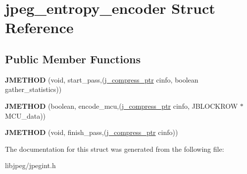 \hypertarget{structjpeg__entropy__encoder}{\section{jpeg\-\_\-entropy\-\_\-encoder Struct Reference}
\label{structjpeg__entropy__encoder}
}
\subsection*{Public Member Functions}
\begin{DoxyCompactItemize}
\item 
\hypertarget{structjpeg__entropy__encoder_aa42cc97f950746e53857b958e00519dd}{{\bfseries J\-M\-E\-T\-H\-O\-D} (void, start\-\_\-pass,(\hyperlink{structjpeg__compress__struct}{j\-\_\-compress\-\_\-ptr} cinfo, boolean gather\-\_\-statistics))}\label{structjpeg__entropy__encoder_aa42cc97f950746e53857b958e00519dd}

\item 
\hypertarget{structjpeg__entropy__encoder_a6852c01b9a63cceaae5f1d0e4ef1185a}{{\bfseries J\-M\-E\-T\-H\-O\-D} (boolean, encode\-\_\-mcu,(\hyperlink{structjpeg__compress__struct}{j\-\_\-compress\-\_\-ptr} cinfo, J\-B\-L\-O\-C\-K\-R\-O\-W $\ast$M\-C\-U\-\_\-data))}\label{structjpeg__entropy__encoder_a6852c01b9a63cceaae5f1d0e4ef1185a}

\item 
\hypertarget{structjpeg__entropy__encoder_a349e641fd2289448e8169b8aa8edefa5}{{\bfseries J\-M\-E\-T\-H\-O\-D} (void, finish\-\_\-pass,(\hyperlink{structjpeg__compress__struct}{j\-\_\-compress\-\_\-ptr} cinfo))}\label{structjpeg__entropy__encoder_a349e641fd2289448e8169b8aa8edefa5}

\end{DoxyCompactItemize}


The documentation for this struct was generated from the following file\-:\begin{DoxyCompactItemize}
\item 
libjpeg/jpegint.\-h\end{DoxyCompactItemize}
